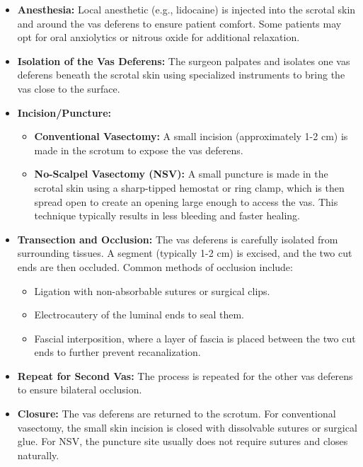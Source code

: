 \begin{itemize}
  \item \textbf{Anesthesia:} Local anesthetic (e.g., lidocaine) is injected into the scrotal skin and around the vas deferens to ensure patient comfort. Some patients may opt for oral anxiolytics or nitrous oxide for additional relaxation.
  
  \item \textbf{Isolation of the Vas Deferens:} The surgeon palpates and isolates one vas deferens beneath the scrotal skin using specialized instruments to bring the vas close to the surface.
  
  \item \textbf{Incision/Puncture:}
    \begin{itemize}
      \item \textbf{Conventional Vasectomy:} A small incision (approximately 1-2 cm) is made in the scrotum to expose the vas deferens.
      \item \textbf{No-Scalpel Vasectomy (NSV):} A small puncture is made in the scrotal skin using a sharp-tipped hemostat or ring clamp, which is then spread open to create an opening large enough to access the vas. This technique typically results in less bleeding and faster healing.
    \end{itemize}
  
  \item \textbf{Transection and Occlusion:} The vas deferens is carefully isolated from surrounding tissues. A segment (typically 1-2 cm) is excised, and the two cut ends are then occluded. Common methods of occlusion include:
    \begin{itemize}
      \item Ligation with non-absorbable sutures or surgical clips.
      \item Electrocautery of the luminal ends to seal them.
      \item Fascial interposition, where a layer of fascia is placed between the two cut ends to further prevent recanalization.
    \end{itemize}
  
  \item \textbf{Repeat for Second Vas:} The process is repeated for the other vas deferens to ensure bilateral occlusion.
  
  \item \textbf{Closure:} The vas deferens are returned to the scrotum. For conventional vasectomy, the small skin incision is closed with dissolvable sutures or surgical glue. For NSV, the puncture site usually does not require sutures and closes naturally.
\end{itemize}

